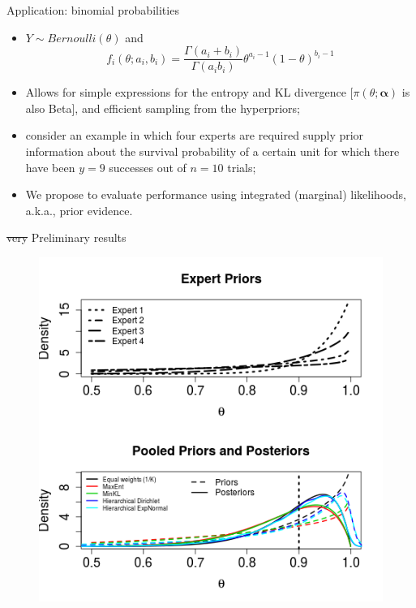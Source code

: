 \begin{frame}{Application: binomial probabilities}
 \begin{itemize}
  \item $Y\sim Bernoulli(\theta)$ and
  \[f_i(\theta;a_i, b_i) = \frac{\Gamma(a_i + b_i)}{\Gamma(a_i b_i)} \theta^{a_i-1}(1-\theta)^{b_i-1}\]
  \item Allows for simple expressions for the entropy and KL divergence [$\pi(\theta; \boldsymbol\alpha)$ is also Beta], and efficient sampling from the hyperpriors;
  \item \cite{savchuk1994} consider an example in which four experts are required supply prior information about the survival probability of
a certain unit for which there have been $y = 9$ successes out of $n = 10$ trials;
  \item We propose to evaluate performance using integrated (marginal) likelihoods, a.k.a., prior evidence.
 \end{itemize}
\end{frame}
\begin{frame}{\sout{very} Preliminary results}
\begin{figure}
 \begin{center}
  \includegraphics[scale=0.4]{../figures/new_beta_example.png}
 \end{center}
\end{figure}
\end{frame}
